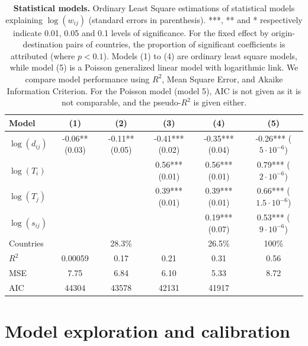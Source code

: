\documentclass[10pt,letterpaper]{article}
\begin{document}
\begin{table}[!ht]
\begin{adjustwidth}{-2.25in}{0in}
\caption{{\bf Statistical models.} Ordinary Least Square estimations of statistical models explaining $\log(w_{ij})$ (standard errors in parenthesis). ***, ** and * respectively indicate 0.01, 0.05 and 0.1 levels of significance. For the fixed effect by origin-destination pairs of countries, the proportion of significant coefficients is attributed (where $p<0.1$). Models (1) to (4) are ordinary least square models, while model (5) is a Poisson generalized linear model with logarithmic link. We compare model performance using $R^2$, Mean Square Error, and Akaike Information Criterion. For the Poisson model (model 5), AIC is not given as it is not comparable, and the pseudo-$R^2$ is given either. \label{tab:reg}}
\medskip
\begin{tabular}{|l|c|c|c|c|c|}
\hline
Model  & (1) & (2) & (3) & (4) & (5) \\ 
\hline
$\log(d_{ij})$ &      -0.06** (0.03) &   -0.11** (0.05)  & -0.41*** (0.02)  & -0.35*** (0.04)  &  -0.26*** ($5\cdot 10^{-6}$) \\
$\log(T_i)$ &   &   & 0.56*** (0.01) &  0.56*** (0.01) & 0.79*** ($2\cdot 10^{-6}$) \\
$\log(T_j)$ &     &   & 0.39*** (0.01) &  0.39*** (0.01) & 0.66***  ($1.5\cdot 10^{-6}$) \\
$\log(s_{ij})$ &     &   &  &  0.19*** (0.07) & 0.53*** ($9\cdot 10^{-6}$)  \\
Countries &    &  28.3\% &   &  26.5\% & 100\% \\
\hline
$R^2$ &       0.00059   &  0.17 & 0.21 &  0.31  &  0.56 \\
MSE & 7.75 & 6.84 & 6.10 & 5.33 & 8.72 \\
AIC &        44304   &  43578  &  42131  & 41917 &   \\
\hline
\end{tabular}
\end{adjustwidth}
\end{table}





\section*{Model exploration and calibration}
\end{document}

